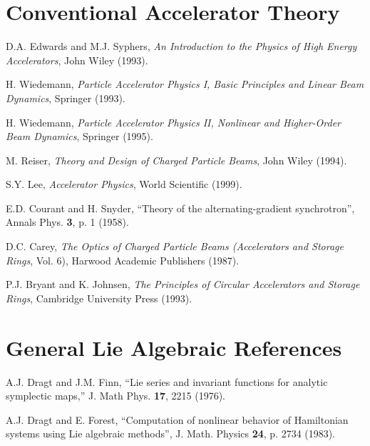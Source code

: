 \section{Conventional Accelerator Theory}
\begin{description}
\item D.A. Edwards and M.J. Syphers, {\em An Introduction to the Physics of High Energy Accelerators}, John Wiley (1993).
\item H. Wiedemann, {\em Particle Accelerator Physics I, Basic Principles and Linear Beam Dynamics},  Springer (1993).
\item H. Wiedemann, {\em Particle Accelerator Physics II, Nonlinear and Higher-Order Beam Dynamics}, Springer (1995).
\item M. Reiser, {\em Theory and Design of Charged Particle Beams}, John Wiley (1994).
\item S.Y. Lee, {\em Accelerator Physics}, World Scientific (1999).
\item E.D. Courant and H. Snyder, ``Theory of the alternating-gradient synchrotron'', Annals Phys. {\bf 3}, p. 1 (1958).
\item D.C. Carey, {\em The Optics of Charged Particle Beams  (Accelerators and Storage Rings}, Vol. 6), Harwood Academic Publishers (1987).
\item P.J. Bryant and K. Johnsen, {\em The Principles of Circular Accelerators and Storage Rings}, Cambridge University Press (1993).
\end{description}
\section{General Lie Algebraic References}
\begin{description}
\item A.J. Dragt and J.M. Finn, ``Lie series and invariant functions for
analytic symplectic maps,'' J. Math Phys. {\bf 17}, 2215 (1976).
\item A.J. Dragt and E. Forest, ``Computation of nonlinear behavior of Hamiltonian systems using Lie algebraic methods'', J. Math. Physics {\bf 24}, p. 2734 (1983).
\end{description}
